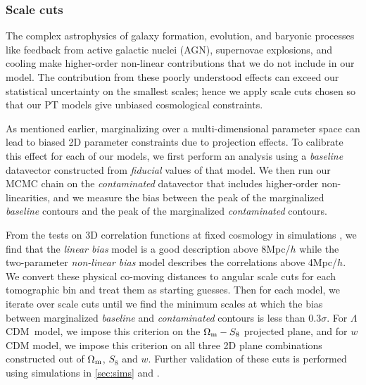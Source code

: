 \documentclass[fleqn,usenatbib]{mnras}
\newcommand{\lcdm}{$\Lambda$CDM}
\begin{document}
\subsubsection{Scale cuts}\label{sec:scale_cuts}

The complex astrophysics of galaxy formation, evolution, and baryonic processes like feedback from active galactic nuclei (AGN), supernovae explosions, and cooling make higher-order non-linear contributions that we do not include in our model. The contribution from these poorly understood effects can exceed our statistical uncertainty on the smallest scales; hence we apply scale cuts chosen so that our PT models give unbiased cosmological constraints.%

As mentioned earlier, marginalizing over a multi-dimensional parameter space can lead to biased 2D parameter constraints due to projection effects. To calibrate this effect for each of our models, we first perform an analysis using a \textit{baseline} datavector constructed from \textit{fiducial} values of that model. 
We then run our MCMC chain on the \textit{contaminated} datavector that includes higher-order non-linearities, and we measure the bias between the peak of the marginalized \textit{baseline} contours and the peak of the marginalized \textit{contaminated} contours. 

From the tests on 3D correlation functions at fixed cosmology in simulations \citep{p2020perturbation}, we find that the \textit{linear bias} model is a good description above 8Mpc/$h$ while the two-parameter \textit{non-linear bias} model describes the correlations above 4Mpc/$h$. We convert these physical co-moving distances to angular scale cuts for each tomographic bin and treat them as starting guesses. Then for each model, we iterate over scale cuts until we find the minimum scales at which the bias between marginalized \textit{baseline} and \textit{contaminated} contours is less than $0.3\sigma$. For \lcdm\ model, we impose this criterion on the $\Omega_{\rm m}-S_8$ projected plane, and for $w$CDM model, we impose this criterion on all three 2D plane combinations constructed out of $\Omega_{\rm m}$, $S_8$ and $w$. Further validation of these cuts is performed using simulations in \ref{sec:sims} and \citet{y3-simvalidation}. 
\end{document}

